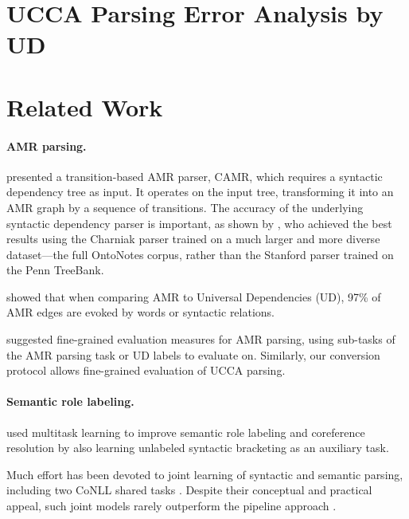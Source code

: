 \documentclass[11pt,a4paper]{article}
\begin{document}
\section{UCCA Parsing Error Analysis by UD}\label{sec:fine_grained}



\section{Related Work}\label{sec:related_work}

\paragraph{AMR parsing.}

presented a transition-based AMR parser, CAMR, which requires a
syntactic dependency tree as input.
It operates on the input tree, transforming it into an AMR graph
by a sequence of transitions.
The accuracy of the underlying syntactic dependency parser is important,
as shown by ,
who achieved the best results using the Charniak parser trained on a
much larger and more diverse dataset---the full OntoNotes corpus,
rather than the Stanford parser trained on the Penn TreeBank.

 showed that when comparing AMR to Universal Dependencies (UD),
97\% of AMR edges are evoked by words or syntactic relations.

 suggested fine-grained evaluation measures
for AMR parsing, using sub-tasks of the AMR parsing task or UD labels to evaluate on.
Similarly, our conversion protocol allows fine-grained evaluation of UCCA parsing.

\paragraph{Semantic role labeling.}

 used multitask learning to improve semantic role labeling and coreference resolution
by also learning unlabeled syntactic bracketing as an auxiliary task.

Much effort has been devoted to joint learning of syntactic
and semantic parsing, including
two CoNLL shared tasks \cite{surdeanu2008conll,hajivc2009conll}.
Despite their conceptual and practical appeal, such joint models rarely outperform
the pipeline approach %
\cite{lluis2008joint,henderson2013multilingual,D15-1169,swayamdipta-EtAl:2016:CoNLL,swayamdipta2017frame}.
\end{document}
